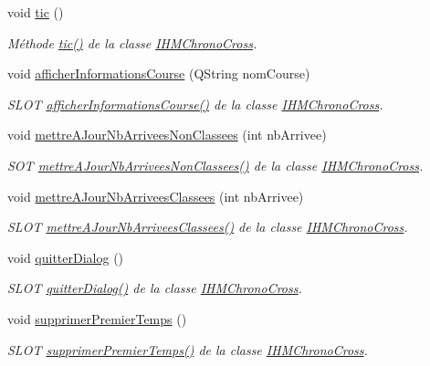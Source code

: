 \begin{DoxyCompactItemize}
void \hyperlink{class_i_h_m_chrono_cross_a9706094a679e33f3595e28776596a91b}{tic} ()
\begin{DoxyCompactList}\small\item\em Méthode \hyperlink{class_i_h_m_chrono_cross_a9706094a679e33f3595e28776596a91b}{tic()} de la classe \hyperlink{class_i_h_m_chrono_cross}{I\+H\+M\+Chrono\+Cross}. \end{DoxyCompactList}\item 
void \hyperlink{class_i_h_m_chrono_cross_afe18e84e4df15c15921f2bdcfc6f4396}{afficher\+Informations\+Course} (Q\+String nom\+Course)
\begin{DoxyCompactList}\small\item\em S\+L\+OT \hyperlink{class_i_h_m_chrono_cross_afe18e84e4df15c15921f2bdcfc6f4396}{afficher\+Informations\+Course()} de la classe \hyperlink{class_i_h_m_chrono_cross}{I\+H\+M\+Chrono\+Cross}. \end{DoxyCompactList}\item 
void \hyperlink{class_i_h_m_chrono_cross_a1b23fda62742f2dd17652d3abcb33dd6}{mettre\+A\+Jour\+Nb\+Arrivees\+Non\+Classees} (int nb\+Arrivee)
\begin{DoxyCompactList}\small\item\em S\+OT \hyperlink{class_i_h_m_chrono_cross_a1b23fda62742f2dd17652d3abcb33dd6}{mettre\+A\+Jour\+Nb\+Arrivees\+Non\+Classees()} de la classe \hyperlink{class_i_h_m_chrono_cross}{I\+H\+M\+Chrono\+Cross}. \end{DoxyCompactList}\item 
void \hyperlink{class_i_h_m_chrono_cross_a3d786cb4b5c5e3a4bd566f19409601d5}{mettre\+A\+Jour\+Nb\+Arrivees\+Classees} (int nb\+Arrivee)
\begin{DoxyCompactList}\small\item\em S\+L\+OT \hyperlink{class_i_h_m_chrono_cross_a3d786cb4b5c5e3a4bd566f19409601d5}{mettre\+A\+Jour\+Nb\+Arrivees\+Classees()} de la classe \hyperlink{class_i_h_m_chrono_cross}{I\+H\+M\+Chrono\+Cross}. \end{DoxyCompactList}\item 
void \hyperlink{class_i_h_m_chrono_cross_a1e8e6d42ec7397a619940bc7bec4a6ca}{quitter\+Dialog} ()
\begin{DoxyCompactList}\small\item\em S\+L\+OT \hyperlink{class_i_h_m_chrono_cross_a1e8e6d42ec7397a619940bc7bec4a6ca}{quitter\+Dialog()} de la classe \hyperlink{class_i_h_m_chrono_cross}{I\+H\+M\+Chrono\+Cross}. \end{DoxyCompactList}\item 
void \hyperlink{class_i_h_m_chrono_cross_aca8b5d6683a3ab0018066ec16968f3f3}{supprimer\+Premier\+Temps} ()
\begin{DoxyCompactList}\small\item\em S\+L\+OT \hyperlink{class_i_h_m_chrono_cross_aca8b5d6683a3ab0018066ec16968f3f3}{supprimer\+Premier\+Temps()} de la classe \hyperlink{class_i_h_m_chrono_cross}{I\+H\+M\+Chrono\+Cross}. \end{DoxyCompactList}\end{DoxyCompactItemize}
